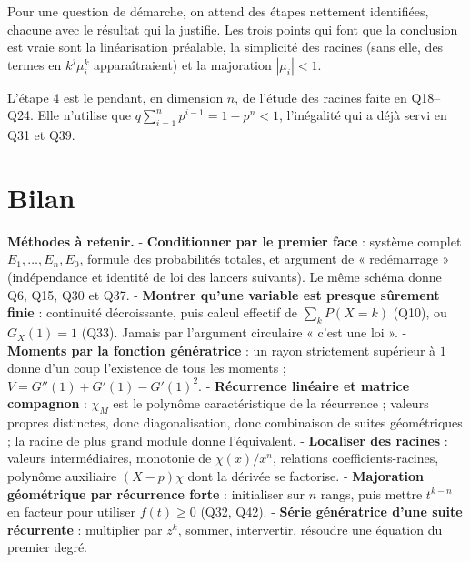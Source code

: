 \documentclass[11pt,a4paper]{article}
\begin{document}
\begin{jury}

Pour une question de démarche, on attend des étapes nettement identifiées, chacune avec le résultat qui la justifie. Les trois points qui font que la conclusion est vraie sont la linéarisation préalable, la simplicité des racines (sans elle, des termes en \(k^j\mu_i^k\) apparaîtraient) et la majoration \(|\mu_i|<1\).

\end{jury}

\begin{methode}

L'étape 4 est le pendant, en dimension \(n\), de l'étude des racines faite en Q18--Q24. Elle n'utilise que \(q\sum_{i=1}^np^{i-1}=1-p^n<1\), l'inégalité qui a déjà servi en Q31 et Q39.

\end{methode}

\hypertarget{bilan}{%
\section{Bilan}\label{bilan}}

\textbf{Méthodes à retenir.}
- \textbf{Conditionner par le premier face} : système complet \(E_1,\dots,E_n,E_0\), formule des probabilités totales, et argument de « redémarrage » (indépendance et identité de loi des lancers suivants). Le même schéma donne Q6, Q15, Q30 et Q37.
- \textbf{Montrer qu'une variable est presque sûrement finie} : continuité décroissante, puis calcul effectif de \(\sum_kP(X=k)\) (Q10), ou \(G_X(1)=1\) (Q33). Jamais par l'argument circulaire « c'est une loi ».
- \textbf{Moments par la fonction génératrice} : un rayon strictement supérieur à \(1\) donne d'un coup l'existence de tous les moments ; \(V=G''(1)+G'(1)-G'(1)^2\).
- \textbf{Récurrence linéaire et matrice compagnon} : \(\chi_M\) est le polynôme caractéristique de la récurrence ; valeurs propres distinctes, donc diagonalisation, donc combinaison de suites géométriques ; la racine de plus grand module donne l'équivalent.
- \textbf{Localiser des racines} : valeurs intermédiaires, monotonie de \(\chi(x)/x^n\), relations coefficients-racines, polynôme auxiliaire \((X-p)\chi\) dont la dérivée se factorise.
- \textbf{Majoration géométrique par récurrence forte} : initialiser sur \(n\) rangs, puis mettre \(t^{k-n}\) en facteur pour utiliser \(f(t)\geqslant0\) (Q32, Q42).
- \textbf{Série génératrice d'une suite récurrente} : multiplier par \(z^k\), sommer, intervertir, résoudre une équation du premier degré.
\end{document}
